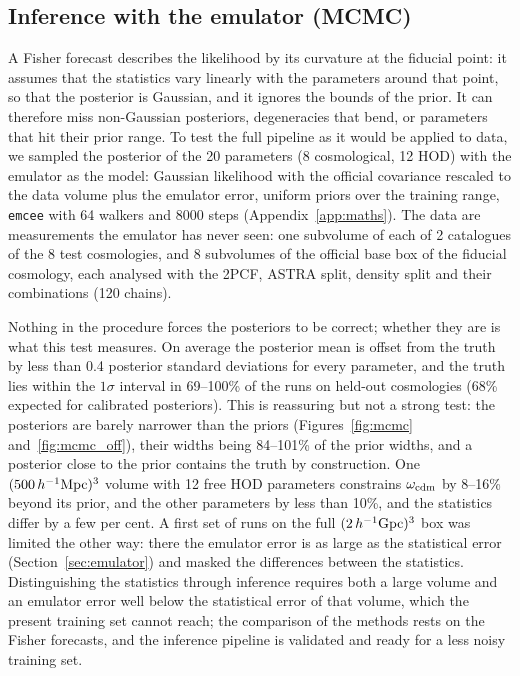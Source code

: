 \subsection{Inference with the emulator (MCMC)}
\label{sec:mcmc}

A Fisher forecast describes the likelihood by its curvature at the fiducial point: it assumes that the statistics vary linearly with the parameters around that point, so that the posterior is Gaussian, and it ignores the bounds of the prior. It can therefore miss non-Gaussian posteriors, degeneracies that bend, or parameters that hit their prior range. To test the full pipeline as it would be applied to data, we sampled the posterior of the 20 parameters (8 cosmological, 12 HOD) with the emulator as the model: Gaussian likelihood with the official covariance rescaled to the data volume plus the emulator error, uniform priors over the training range, \texttt{emcee} with 64 walkers and 8000 steps (Appendix~\ref{app:maths}). The data are measurements the emulator has never seen: one subvolume of each of 2 catalogues of the 8 test cosmologies, and 8 subvolumes of the official base box of the fiducial cosmology, each analysed with the 2PCF, ASTRA split, density split and their combinations (120 chains).

Nothing in the procedure forces the posteriors to be correct; whether they are is what this test measures. On average the posterior mean is offset from the truth by less than 0.4 posterior standard deviations for every parameter, and the truth lies within the $1\sigma$ interval in 69--100\% of the runs on held-out cosmologies (68\% expected for calibrated posteriors). This is reassuring but not a strong test: the posteriors are barely narrower than the priors (Figures~\ref{fig:mcmc} and~\ref{fig:mcmc_off}), their widths being 84--101\% of the prior widths, and a posterior close to the prior contains the truth by construction. One $(500\,h^{-1}\mathrm{Mpc})^3$ volume with 12 free HOD parameters constrains $\omega_{\rm cdm}$ by 8--16\% beyond its prior, and the other parameters by less than 10\%, and the statistics differ by a few per cent. A first set of runs on the full $(2\,h^{-1}{\rm Gpc})^3$ box was limited the other way: there the emulator error is as large as the statistical error (Section~\ref{sec:emulator}) and masked the differences between the statistics. Distinguishing the statistics through inference requires both a large volume and an emulator error well below the statistical error of that volume, which the present training set cannot reach; the comparison of the methods rests on the Fisher forecasts, and the inference pipeline is validated and ready for a less noisy training set.

